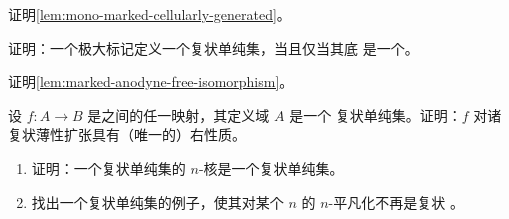 \begin{exercise}\label{ex:prove-lem-mono-generated}
证明\cref{lem:mono-marked-cellularly-generated}。
\end{exercise}

\begin{exercise}\label{ex:maximally-marked-kan}
证明：一个极大标记\trSimplicialSet{}定义一个复状单纯集，当且仅当其底\trSimplicialSet{}%
是一个\trKanComplex。
\end{exercise}

\begin{exercise}\label{ex:prove-lem-anodyne}
证明\cref{lem:marked-anodyne-free-isomorphism}。
\end{exercise}

\begin{exercise}\label{ex:thinness-for-free}
设 $f\colon A\to B$ 是\trMarkedSimplicialSet{}之间的任一映射，其定义域 $A$ 是一个
复状单纯集。证明：$f$ 对诸复状薄性扩张具有（唯一的）右\trLifting{}性质。
\end{exercise}

\begin{exercise}\label{ex:n-core-complicial}
\begin{enumerate}[label=(\roman*)]
\item 证明：一个复状单纯集的 $n$-核是一个复状单纯集。
\item 找出一个复状单纯集的例子，使其对某个 $n$ 的 $n$-平凡化不再是复状%
  \trSimplicialSet{}。
\end{enumerate}
\end{exercise}

